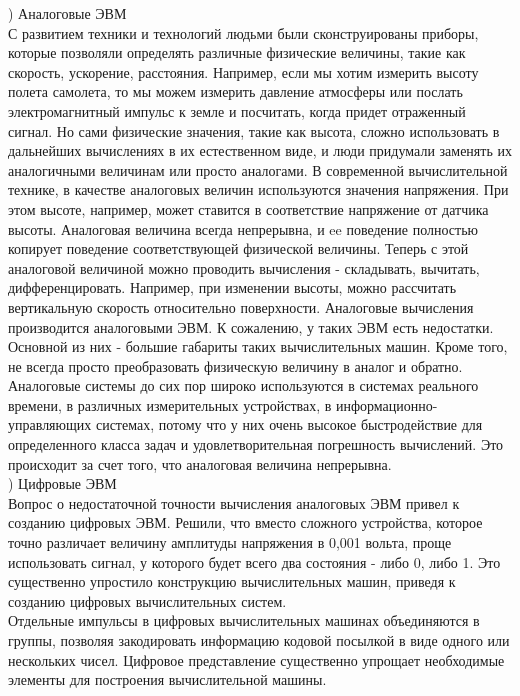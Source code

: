 ) Аналоговые ЭВМ \\
С развитием техники и технологий людьми были сконструированы приборы, которые позволяли определять различные физические величины, такие как скорость, ускорение, расстояния. Например, если мы хотим измерить высоту полета самолета, то мы можем измерить давление атмосферы или послать электромагнитный импульс к земле и посчитать, когда придет отраженный сигнал. Но сами физические значения, такие как высота, сложно использовать в дальнейших вычислениях в их естественном виде, и люди придумали заменять их аналогичными величинам или просто аналогами. В современной вычислительной технике, в качестве аналоговых величин используются значения напряжения. При этом высоте, например, может ставится в соответствие напряжение от датчика высоты. Аналоговая величина всегда непрерывна, и ee поведение полностью копирует поведение соответствующей физической величины. Теперь с этой аналоговой величиной можно проводить вычисления - складывать, вычитать, дифференцировать. Например, при изменении высоты, можно рассчитать вертикальную скорость относительно поверхности. Аналоговые вычисления производится аналоговыми ЭВМ. К сожалению, у таких ЭВМ есть недостатки. \\
Основной из них - большие габариты таких вычислительных машин. Кроме того, не всегда просто преобразовать физическую величину в аналог и обратно. Аналоговые системы до сих пор широко используются в системах реального времени, в различных измерительных устройствах, в информационно-управляющих системах, потому что у них очень высокое быстродействие для определенного класса задач и удовлетворительная погрешность вычислений. Это происходит за счет того, что аналоговая величина непрерывна. \\

) Цифровые ЭВМ \\
Вопрос о недостаточной точности вычисления аналоговых ЭВМ привел к созданию цифровых ЭВМ. Решили, что вместо сложного устройства, которое точно различает величину амплитуды напряжения в 0,001 вольта, проще использовать сигнал, у которого будет всего два состояния - либо 0, либо 1. Это существенно упростило конструкцию вычислительных машин, приведя к созданию цифровых вычислительных систем. \\
Отдельные импульсы в цифровых вычислительных машинах объединяются в группы, позволяя закодировать информацию кодовой посылкой в виде одного или нескольких чисел. Цифровое представление существенно упрощает необходимые элементы для построения вычислительной машины. \\

